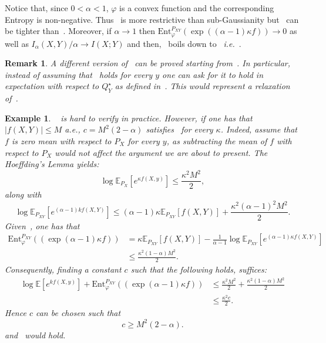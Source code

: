 \documentclass{article}
\numberwithin{theorem}{section}
\newtheorem{example}{Example}
\numberwithin{example}{section}
\newtheorem{remark}{Remark}
\numberwithin{remark}{section}
\numberwithin{definition}{section}
\newcommand{\revised}[1]{{\color{black} #1}}
\begin{document}
Notice that, since $0<\alpha<1$, $\varphi$ is a convex function and the corresponding Entropy is non-negative. Thus~ is more restrictive than sub-Gaussianity but~ can be tighter than~.  Moreover, if $\alpha\to 1$ then $\text{Ent}_\varphi^{P_{XY}}(\exp((\alpha-1)\kappa f))\to 0$ as well as $I_\alpha(X,Y)/\alpha\to I(X;Y)$ and then,~ boils down to~\cite[Lemma 1]{XuR:17} \textit{i.e.}~.
\begin{remark}
A different version of~ can be proved starting from~. In particular, instead of assuming that~ holds for every $y$ one can ask for it to hold in expectation with respect to $Q_Y^{\star}$ as defined in~. This would represent a relaxation of~.
\end{remark}
\revised{
\begin{example}
    ~\Cref{eq:subGaussGener} is hard to verify in practice. However, if one has that $|f(X,Y)|\leq M$ a.e., $c = M^2(2-\alpha)$ satisfies~\Cref{eq:subGaussGener} for every $\kappa$. Indeed, assume that $f$ is zero mean with respect to $P_X$ for every $y$, as subtracting the mean of $f$ with respect to $P_X$ would not affect the argument we are about to present. The Hoeffding's Lemma yields:
    \begin{equation}
        \log\mathbb{E}_{P_X}[e^{\kappa f(X,y)}] \leq \frac{\kappa^2M^2}{2}, \label{eq:boundedCGF}
    \end{equation}
    along with 
    \begin{equation}
    \log\mathbb{E}_{P_{XY}}[e^{(\alpha-1)kf(X,Y)}] \leq (\alpha-1)\kappa\mathbb{E}_{P_{XY}}[f(X,Y)]+\frac{\kappa^2(\alpha-1)^2M^2}{2}.\label{eq:boundedCGF2}
    \end{equation}
    Given~\Cref{eq:boundedCGF2}, one has that 
       \begin{align}
           \text{Ent}^{P_{XY}}_{\varphi}((\exp(\alpha-1)\kappa f))  \nonumber &=\kappa \mathbb{E}_{P_{XY}}[f(X,Y)]-\frac{1}{\alpha-1}\log\mathbb{E}_{P_{XY}}[e^{(\alpha-1)\kappa f(X,Y)}] \\
           &\leq \frac{\kappa^2 (1-\alpha)M^2}{2}.
       \end{align}
       Consequently, finding a constant $c$ such that the following holds, suffices: \begin{align}
           \log\mathbb{E}[e^{kf(X,y)}]+\text{Ent}^{P_{XY}}_{\varphi}((\exp(\alpha-1)\kappa f))&\leq \frac{\kappa^2 M^2}{2} + \frac{\kappa^2 (1-\alpha)M^2}{2}  \\
 &\leq \frac{\kappa^2c}{2}.
       \end{align}
       Hence $c$ can be chosen such that
       \begin{equation}
           c \geq M^2(2-\alpha).
       \end{equation}
      and~\Cref{eq:subGaussGener} would hold.
\end{example}}
\end{document}
